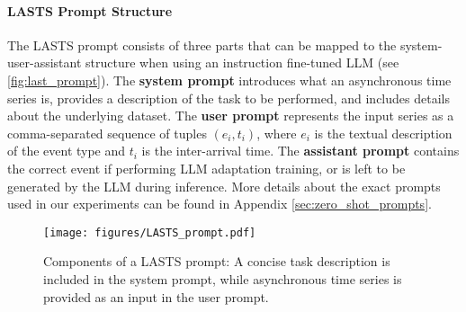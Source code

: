 \begin{comment}
\paragraph{Event Representation} We experimented with multiple ways to represent asynchronous time series data in the prompt, aiming to understand the best structure for effective LLM interaction. Specifically, we tested the following variations:
\begin{itemize} \itemsep0em 
    \item Representing each event as either (inter\_arrival\_time $t_i$, event\_type $e_i$) or (event\_type $e_i$, inter\_arrival\_time $t_i$). We wanted to test here if predicting the event type first helps the model get better time predictions.
    \item Using scrambled names for event types to assess the model's reliance on world knowledge in understanding the event descriptions.
    \item Using durations instead of inter arrival time as a time representation $t_i$
\end{itemize}
\end{comment}

\paragraph{LASTS Prompt Structure} The LASTS prompt consists of three parts that can be mapped to the system-user-assistant structure when using an instruction fine-tuned LLM (see \autoref{fig:last_prompt}). The \textbf{system prompt} introduces what an asynchronous time series is, provides a description of the task to be performed, and includes details about the underlying dataset. The \textbf{user prompt} represents the input series as a comma-separated sequence of tuples \((e_i, t_i)\), where \(e_i\) is the textual description of the event type and \(t_i\) is the inter-arrival time. The \textbf{assistant prompt} contains the correct event if performing LLM adaptation training, or is left to be generated by the LLM during inference. More details about the exact prompts used in our experiments can be found in Appendix \ref{sec:zero_shot_prompts}.

\begin{figure}[t]
\centering
\texttt{[image: figures/LASTS\_prompt.pdf]}
\caption{Components of a LASTS prompt: A concise task description is included in the system prompt, while asynchronous time series is provided as an input in the user prompt.}
\label{fig:last_prompt}
\end{figure} 


